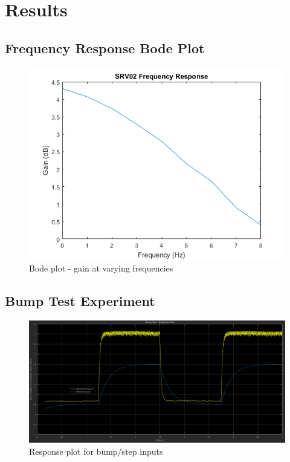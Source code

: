 \section{Results}

\subsection{Frequency Response Bode Plot}
  \begin{figure}[htb]
    \centering
    \includegraphics[scale=0.35]{figures/freqResponse.png}
    \caption{Bode plot - gain at varying frequencies}
    \label{fig:bode}
  \end{figure}
\subsection{Bump Test Experiment}
  \begin{figure}[htb]
    \centering
    \includegraphics[scale=0.6]{figures/Bump.png}
    \caption{Response plot for bump/step inputs}
    \label{fig:bump}
  \end{figure}
